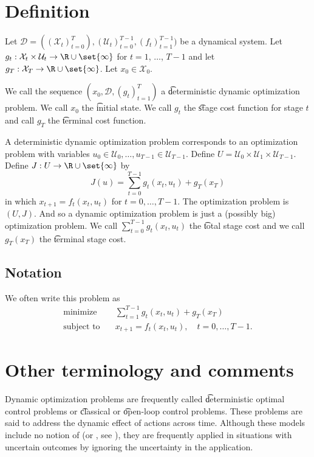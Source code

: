 

\section*{Definition}

Let $\mathcal{D}  = ((\mathcal{X} _t)_{t = 0}^{T}), (\mathcal{U} _t)_{t=0}^{T-1}, (f_t)_{t=1}^{T-1})$ be a dynamical system.
Let $g_t: \mathcal{X} _t \times  \mathcal{U} _t \to \R  \cup \set{\infty}$ for $t = 1$, $\dots $, $T-1$ and let $g_{T}: \mathcal{X} _T \to \R  \cup \set{\infty}$.
Let $x_0 \in \mathcal{X} _0$.

We call the sequence $(x_0, \mathcal{D} , (g_t)_{t = 1}^{T})$ a \t{deterministic dynamic optimization problem}.
We call $x_0$ the \t{initial state}.
We call $g_t$ the \t{stage cost function} for stage $t$ and call $g_T$ the \t{terminal cost function}.

A deterministic dynamic optimization problem corresponds to an optimization problem with variables $u_0 \in \mathcal{U} _0, \dots , u_{T-1} \in \mathcal{U} _{T-1}$.
Define $U = \mathcal{U} _0 \times  \mathcal{U} _1 \times \mathcal{U} _{T-1}$.
Define $J: U \to \R  \cup \set{\infty}$ by
    \[
J(u) = \sum_{t = 0}^{T-1} g_t(x_t, u_t) + g_T(x_T)
    \]
in which $x_{t+1} = f_t(x_t, u_t)$ for $t = 0, \dots , T-1$.
The optimization problem is $(U, J)$.
And so a dynamic optimization problem is just a (possibly big) optimization problem.
We call $\sum_{t = 0}^{T-1} g_t(x_t, u_t)$ the \t{total stage cost} and we call $g_T(x_T)$ the \t{terminal stage cost}.

\subsection*{Notation}

We often write this problem as
    \[
\begin{aligned}
\text{minimize}\quad & \sum_{t = 1}^{T-1} g_t(x_t, u_t) + g_T(x_T) \\
\text{subject to}\quad & x_{t+1} = f_t(x_t, u_t), \quad t = 0, \dots , T-1.
\end{aligned}
    \]

\section*{Other terminology and comments}

Dynamic optimization problems are frequently called \t{deterministic optimal control} problems or \t{classical} or \t{open-loop control} problems.
These problems are said to address the dynamic effect of actions across time.
Although these models include no notion of  (or , see ), they are frequently applied in situations with uncertain outcomes by ignoring the uncertainty in the application.
